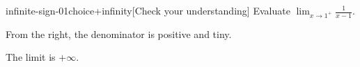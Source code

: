 \begin{bgcheck}{infinite-sign-01}{choice}{+infinity}[Check your understanding]
Evaluate \(\lim_{x\to1^+}\frac1{x-1}\).
\begin{bghint}
From the right, the denominator is positive and tiny.
\end{bghint}
\begin{bgreveal}
The limit is \(+\infty\).
\end{bgreveal}
\end{bgcheck}
